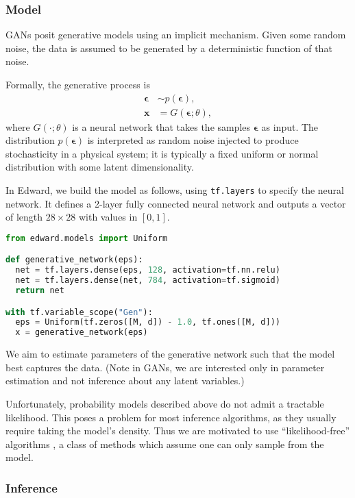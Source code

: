\subsubsection{Model}

GANs posit generative models using an implicit mechanism. Given some
random noise, the data is assumed to be generated by a deterministic
function of that noise.

Formally, the generative process is
\begin{align*}
\mathbf{\epsilon} &\sim p(\mathbf{\epsilon}), \\
\mathbf{x} &= G(\mathbf{\epsilon}; \theta),
\end{align*}
where $G(\cdot; \theta)$ is a neural network that takes the samples
$\mathbf{\epsilon}$ as input. The distribution
$p(\mathbf{\epsilon})$ is interpreted as random noise injected to
produce stochasticity in a physical system; it is typically a fixed
uniform or normal distribution with some latent dimensionality.

In Edward, we build the model as follows, using \texttt{tf.layers} to
specify the neural network. It defines a 2-layer fully connected neural
network and outputs a vector of length $28\times28$ with values in
$[0,1]$.

\begin{lstlisting}[language=Python]
from edward.models import Uniform

def generative_network(eps):
  net = tf.layers.dense(eps, 128, activation=tf.nn.relu)
  net = tf.layers.dense(net, 784, activation=tf.sigmoid)
  return net

with tf.variable_scope("Gen"):
  eps = Uniform(tf.zeros([M, d]) - 1.0, tf.ones([M, d]))
  x = generative_network(eps)
\end{lstlisting}

We aim to estimate parameters of the generative network such
that the model best captures the data. (Note in GANs, we are
interested only in parameter estimation and not inference about any
latent variables.)

Unfortunately, probability models described above do not admit a tractable
likelihood. This poses a problem for most inference algorithms, as
they usually require taking the model's density.  Thus we are
motivated to use ``likelihood-free'' algorithms
\citep{marin2012approximate}, a class of methods which assume one
can only sample from the model.

\subsubsection{Inference}


